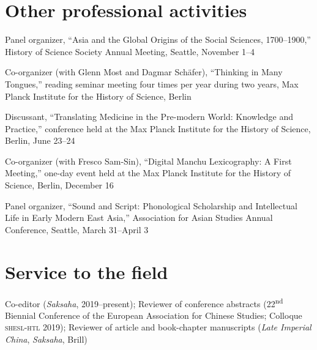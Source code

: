\documentclass[10pt,a4paper]{article}
\newcommand{\years}[1]{\marginnote{\scriptsize #1}}
\begin{document}
\section*{Other professional activities%
}

\noindent \years{2018}Panel organizer, ``Asia and the Global Origins of the Social Sciences, 1700--1900,'' History of Science Society Annual Meeting, Seattle, November 1--4 %

\noindent \years{2015--17}Co-organizer (with Glenn Most and Dagmar Schäfer), ``Thinking in Many Tongues,'' reading seminar meeting four times per year during two years, Max Planck Institute for the History of Science, Berlin

\noindent \years{2017}Discussant, ``Translating Medicine in the Pre-modern World: Knowledge and Practice,'' conference held at the Max Planck Institute for the History of Science, Berlin, June 23--24

\noindent \years{2016}Co-organizer (with Fresco Sam-Sin), ``Digital Manchu Lexicography: A First Meeting,'' one-day event held at the Max Planck Institute for the History of Science, Berlin, December 16

\noindent \years{2016}Panel organizer, ``Sound and Script: Phonological Scholarship and Intellectual Life in Early Modern East Asia,'' Association for Asian Studies Annual Conference, Seattle, March 31--April 3





\section*{Service to the field%
}

\noindent %
Co-editor (\emph{Saksaha}, 2019--present); Reviewer of conference abstracts (22\textsuperscript{nd} Biennial Conference of the European Association for Chinese Studies; Colloque \textsc{shesl-htl} 2019); %
Reviewer of article and book-chapter manuscripts (\emph{Late Imperial China}, \emph{Saksaha}, Brill)
\end{document}
